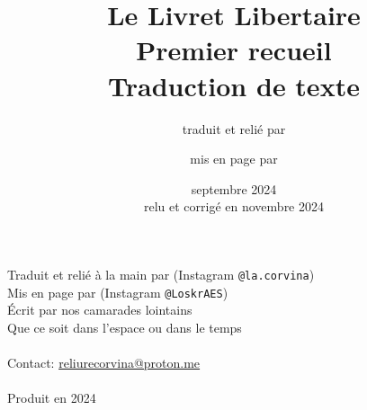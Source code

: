 \usepackage[placement=center,angle=45,color=black!35,scale=4]{background}


\title{Le Livret Libertaire\\[2em]\large Premier recueil\\[2em]\large Traduction de texte}
\author{\normalsize traduit et relié par  \and \normalsize mis en page par }
\date{septembre 2024\\relu et corrigé en novembre 2024}



 
\fontsize{12}{15}\selectfont

\afterpage{\blankpage[-4]}
\afterpage{\blankpage}
\afterpage{\blankpage}
\afterpage{\blankpage}

\frontmatter
\maketitle

\begin{flushleft}
	\vspace*{\fill}
	\small

	Traduit et relié à la main par  (Instagram \texttt{@la.corvina})\\
	Mis en page par  (Instagram \texttt{@LoskrAES})\\
	Écrit par nos camarades lointains\\
	Que ce soit dans l’espace ou dans le temps\\
	~\\
	Contact: \href{mailto:reliurecorvina@proton.me}{reliurecorvina@proton.me}\\
	~\\
	Produit en 2024
\end{flushleft}




